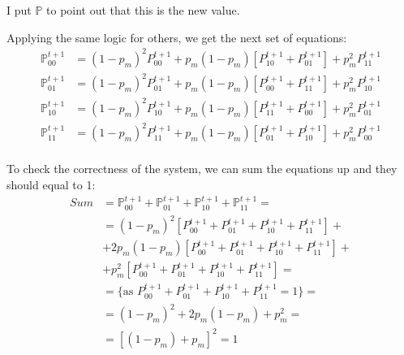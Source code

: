 \documentclass[12pt, a4paper]{article}
\begin{document}
        I put $\mathbb{P}$ to point out that this is the new value.

        Applying the same logic for others, we get the next set of equations:
        \begin{align*}
            \mathbb{P}_{00}^{t+1} &= (1 - p_m)^2 P_{00}^{t+1} + p_m(1 - p_m)[P_{10}^{t+1} + P_{01}^{t+1}] + p_m^2 P_{11}^{t+1} \\
            \mathbb{P}_{01}^{t+1} &= (1 - p_m)^2 P_{01}^{t+1} + p_m(1 - p_m)[P_{00}^{t+1} + P_{11}^{t+1}] + p_m^2 P_{10}^{t+1} \\
            \mathbb{P}_{10}^{t+1} &= (1 - p_m)^2 P_{10}^{t+1} + p_m(1 - p_m)[P_{11}^{t+1} + P_{00}^{t+1}] + p_m^2 P_{01}^{t+1} \\
            \mathbb{P}_{11}^{t+1} &= (1 - p_m)^2 P_{11}^{t+1} + p_m(1 - p_m)[P_{01}^{t+1} + P_{10}^{t+1}] + p_m^2 P_{00}^{t+1} \\
        \end{align*}

        To check the correctness of the system, we can sum the equations up and they should equal to 1:
        \begin{align*}
            Sum &= \mathbb{P}_{00}^{t+1} + \mathbb{P}_{01}^{t+1} + \mathbb{P}_{10}^{t+1} + \mathbb{P}_{11}^{t+1} = \\
            & = (1 - p_m)^2 [P_{00}^{t+1} + P_{01}^{t+1} + P_{10}^{t+1} + P_{11}^{t+1}] +\\
            & + 2 p_m (1 - p_m)[P_{00}^{t+1} + P_{01}^{t+1} + P_{10}^{t+1} + P_{11}^{t+1}] +\\
            & + p_m^2 [P_{00}^{t+1} + P_{01}^{t+1} + P_{10}^{t+1} + P_{11}^{t+1}] =\\
            & = \{\text{as } P_{00}^{t+1} + P_{01}^{t+1} + P_{10}^{t+1} + P_{11}^{t+1} = 1\} =\\
            & = (1 - p_m)^2 + 2 p_m (1 - p_m) + p_m^2 =\\
            & = [(1 - p_m) + p_m]^2 = 1
        \end{align*}\textbf{}
\end{document}
